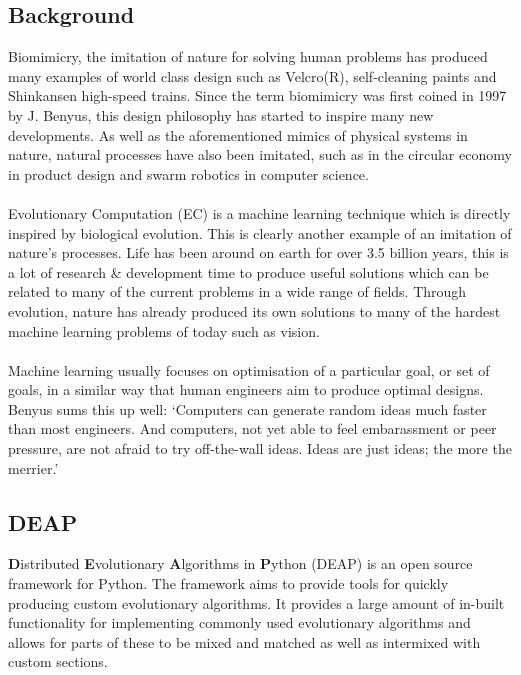 \documentclass[12pt]{article}
\begin{document}
\subsection{Background}
Biomimicry, the imitation of nature for solving human problems has produced many examples of world class design such as Velcro(R), self-cleaning paints and Shinkansen high-speed trains\cite{biomimicry}.  Since the term biomimicry was first coined in 1997 by J. Benyus, this design philosophy has started to inspire many new developments. As well as the aforementioned mimics of physical systems in nature, natural processes have also been imitated, such as in the circular economy in product design and swarm robotics in computer science.
\\\\
Evolutionary Computation (EC) is a machine learning technique which is directly inspired by biological evolution. This is clearly another example of an imitation of nature's processes. Life has been around on earth for over 3.5 billion years, this is a lot of research \& development time to produce useful solutions which can be related to many of the current problems in a wide range of fields. Through evolution, nature has already produced its own solutions to many of the hardest machine learning problems of today such as vision.
\\\\
Machine learning usually focuses on optimisation of a particular goal, or set of goals, in a similar way that human engineers aim to produce optimal designs. Benyus sums this up well: `Computers can generate random ideas much faster than most engineers. And computers, not yet able to feel embarassment or peer pressure, are not afraid to try off-the-wall ideas. Ideas are just ideas; the more the merrier.'\cite[pp.209]{biomimicry}

\subsection{DEAP}
\textbf{D}istributed \textbf{E}volutionary \textbf{A}lgorithms in \textbf{P}ython (DEAP) is an open source framework for Python\cite{deap}. The framework aims to provide tools for quickly producing custom evolutionary algorithms. It provides a large amount of in-built functionality for implementing commonly used evolutionary algorithms and allows for parts of these to be mixed and matched as well as intermixed with custom sections. %
\end{document}
